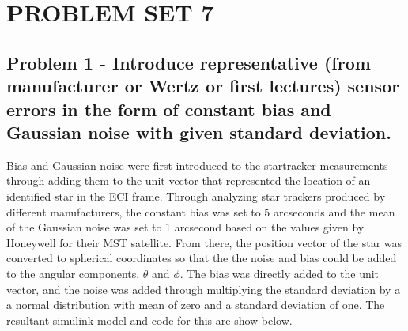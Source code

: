 \section{\Large PROBLEM SET 7}

\subsection{Problem 1 - Introduce representative (from manufacturer or Wertz or first lectures) sensor errors in the form of constant bias and Gaussian noise with given standard deviation.}

Bias and Gaussian noise were first introduced to the startracker measurements through adding them to the unit vector that represented the location of an identified star in the ECI frame. Through analyzing star trackers produced by different manufacturers, the constant bias was set to 5 arcseconds and the mean of the Gaussian noise was set to 1 arcsecond based on the values given by Honeywell for their MST satellite. From there, the position vector of the star was converted to spherical coordinates so that the the noise and bias could be added to the angular components, $\theta$ and $\phi$. The bias was directly added to the unit vector, and the noise was added through multiplying the standard deviation by a a normal distribution with mean of zero and a standard deviation of one. The resultant simulink model and code for this are show below.



